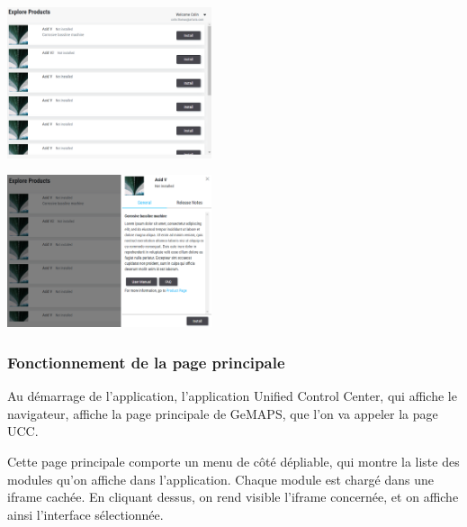 \documentclass[francais]{rapportPFE}  %
\begin{document}
\begin{center}
    \centering
    \begin{minipage}{.5\textwidth}
    \centering
    \includegraphics[width=6cm]{graphics/vue_demo.png}
    \label{fig:test1}
    \end{minipage}%
    \begin{minipage}{.5\textwidth}
    \centering
    \includegraphics[width=6cm]{graphics/vue_demo2.png}
    \label{fig:test2}
    \end{minipage}
    \end{center}


\subsubsection{Fonctionnement de la page principale}

Au démarrage de l'application, l'application Unified Control Center, qui affiche le navigateur, affiche la page principale de GeMAPS, que l'on va appeler la page UCC.

Cette page principale comporte un menu de côté dépliable, qui montre la liste des modules qu'on affiche dans l'application. Chaque module est chargé dans une iframe cachée. En cliquant dessus, on rend visible l'iframe concernée, et on affiche ainsi l'interface sélectionnée.
\end{document}
